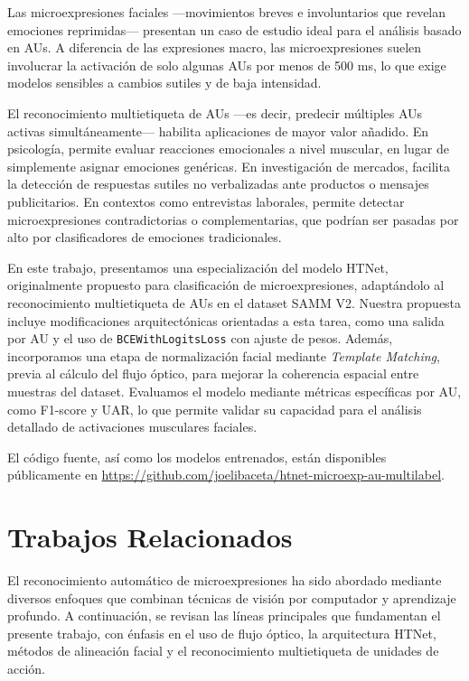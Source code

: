 \documentclass[conference]{IEEEtran}
\begin{document}
Las microexpresiones faciales —movimientos breves e involuntarios que revelan emociones reprimidas— presentan un caso de estudio ideal para el análisis basado en AUs. A diferencia de las expresiones macro, las microexpresiones suelen involucrar la activación de solo algunas AUs por menos de 500 ms, lo que exige modelos sensibles a cambios sutiles y de baja intensidad.

El reconocimiento multietiqueta de AUs —es decir, predecir múltiples AUs activas simultáneamente— habilita aplicaciones de mayor valor añadido. En psicología, permite evaluar reacciones emocionales a nivel muscular, en lugar de simplemente asignar emociones genéricas. En investigación de mercados, facilita la detección de respuestas sutiles no verbalizadas ante productos o mensajes publicitarios. En contextos como entrevistas laborales, permite detectar microexpresiones contradictorias o complementarias, que podrían ser pasadas por alto por clasificadores de emociones tradicionales.

En este trabajo, presentamos una especialización del modelo HTNet, originalmente propuesto para clasificación de microexpresiones, adaptándolo al reconocimiento multietiqueta de AUs en el dataset SAMM V2. Nuestra propuesta incluye modificaciones arquitectónicas orientadas a esta tarea, como una salida por AU y el uso de \texttt{BCEWithLogitsLoss} con ajuste de pesos. Además, incorporamos una etapa de normalización facial mediante \textit{Template Matching}, previa al cálculo del flujo óptico, para mejorar la coherencia espacial entre muestras del dataset. Evaluamos el modelo mediante métricas específicas por AU, como F1-score y UAR, lo que permite validar su capacidad para el análisis detallado de activaciones musculares faciales.

El código fuente, así como los modelos entrenados, están disponibles públicamente en \url{https://github.com/joelibaceta/htnet-microexp-au-multilabel}.

\section{Trabajos Relacionados}

El reconocimiento automático de microexpresiones ha sido abordado mediante diversos enfoques que combinan técnicas de visión por computador y aprendizaje profundo. A continuación, se revisan las líneas principales que fundamentan el presente trabajo, con énfasis en el uso de flujo óptico, la arquitectura HTNet, métodos de alineación facial y el reconocimiento multietiqueta de unidades de acción.
\end{document}
